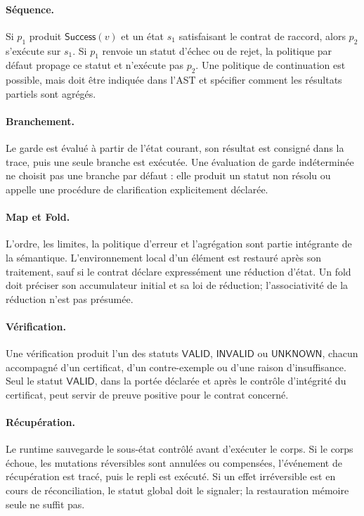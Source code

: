 \documentclass[11pt,a4paper]{article}
\theoremstyle{definition}
\theoremstyle{plain}
\theoremstyle{remark}
\begin{document}
\paragraph{Séquence.} Si $p_1$ produit $\mathsf{Success}(v)$ et un état $s_1$ satisfaisant le contrat de raccord, alors $p_2$ s'exécute sur $s_1$. Si $p_1$ renvoie un statut d'échec ou de rejet, la politique par défaut propage ce statut et n'exécute pas $p_2$. Une politique de continuation est possible, mais doit être indiquée dans l'AST et spécifier comment les résultats partiels sont agrégés.

\paragraph{Branchement.} Le garde est évalué à partir de l'état courant, son résultat est consigné dans la trace, puis une seule branche est exécutée. Une évaluation de garde indéterminée ne choisit pas une branche par défaut : elle produit un statut non résolu ou appelle une procédure de clarification explicitement déclarée.

\paragraph{Map et Fold.} L'ordre, les limites, la politique d'erreur et l'agrégation sont partie intégrante de la sémantique. L'environnement local d'un élément est restauré après son traitement, sauf si le contrat déclare expressément une réduction d'état. Un fold doit préciser son accumulateur initial et sa loi de réduction; l'associativité de la réduction n'est pas présumée.

\paragraph{Vérification.} Une vérification produit l'un des statuts $\mathsf{VALID}$, $\mathsf{INVALID}$ ou $\mathsf{UNKNOWN}$, chacun accompagné d'un certificat, d'un contre-exemple ou d'une raison d'insuffisance. Seul le statut $\mathsf{VALID}$, dans la portée déclarée et après le contrôle d'intégrité du certificat, peut servir de preuve positive pour le contrat concerné.

\paragraph{Récupération.} Le runtime sauvegarde le sous-état contrôlé avant d'exécuter le corps. Si le corps échoue, les mutations réversibles sont annulées ou compensées, l'événement de récupération est tracé, puis le repli est exécuté. Si un effet irréversible est en cours de réconciliation, le statut global doit le signaler; la restauration mémoire seule ne suffit pas.
\end{document}
